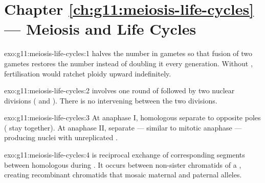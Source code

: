 \section*{Chapter \ref{ch:g11:meiosis-life-cycles} --- Meiosis and Life Cycles}

\begin{solution}{exo:g11:meiosis-life-cycles:1}
 halves the  number in gametes so that fusion of two gametes
restores the  number instead of doubling it every generation. Without
, fertilisation would ratchet ploidy upward indefinitely.
\end{solution}

\begin{solution}{exo:g11:meiosis-life-cycles:2}
 involves one round of  followed by two nuclear
divisions ( and ). There is no intervening  between
the two divisions.
\end{solution}

\begin{solution}{exo:g11:meiosis-life-cycles:3}
At anaphase I, homologous  separate to opposite poles ( stay together). At anaphase II,  separate ---
similar to mitotic anaphase --- producing  nuclei with unreplicated
.
\end{solution}

\begin{solution}{exo:g11:meiosis-life-cycles:4}
 is reciprocal exchange of corresponding  segments between
homologous  during . It occurs between non-sister
chromatids of a , creating recombinant chromatids that mosaic maternal
and paternal alleles.
\end{solution}

